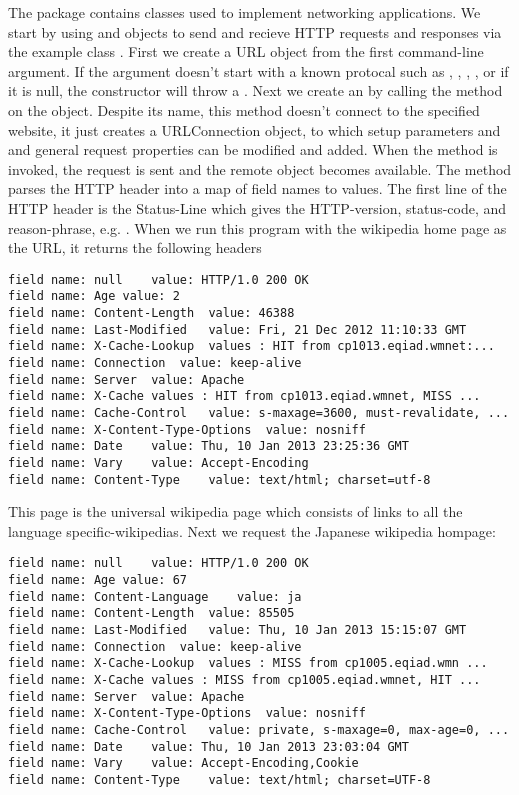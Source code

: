 The  package contains classes used to implement networking applications.
We start by using  and  objects
to send and recieve HTTP requests and responses via the example class .
%
%
%
First we create a URL object from the first command-line argument.
If the argument doesn't start with a known protocal such as
, , , , or if it is null,
the constructor will throw a .
Next we create an  by calling the 
method on the  object.
Despite its name, this method doesn't connect to the specified website, it just
creates a URLConnection object, to which setup parameters and and general 
request properties can be modified and added.
When the  method is invoked, the request is sent and the remote object
becomes available.  
%
%
The method  parses the HTTP header into a map of
field names to values.
The first line of the HTTP header is the Status-Line which gives the
HTTP-version, status-code, and  reason-phrase, e.g.
.
When we run this program with the wikipedia home page as the URL,
it returns the following headers
%
\begin{verbatim} 
field name: null	value: HTTP/1.0 200 OK 
field name: Age	value: 2
field name: Content-Length	value: 46388
field name: Last-Modified	value: Fri, 21 Dec 2012 11:10:33 GMT
field name: X-Cache-Lookup	values : HIT from cp1013.eqiad.wmnet:...
field name: Connection	value: keep-alive
field name: Server	value: Apache
field name: X-Cache	values : HIT from cp1013.eqiad.wmnet, MISS ...
field name: Cache-Control	value: s-maxage=3600, must-revalidate, ...
field name: X-Content-Type-Options	value: nosniff
field name: Date	value: Thu, 10 Jan 2013 23:25:36 GMT
field name: Vary	value: Accept-Encoding
field name: Content-Type	value: text/html; charset=utf-8
\end{verbatim}
%
This page is the universal wikipedia page which consists of links to all
the language specific-wikipedias.
Next we request the Japanese wikipedia hompage:
%
\begin{verbatim}
field name: null	value: HTTP/1.0 200 OK 
field name: Age	value: 67
field name: Content-Language	value: ja
field name: Content-Length	value: 85505
field name: Last-Modified	value: Thu, 10 Jan 2013 15:15:07 GMT
field name: Connection	value: keep-alive
field name: X-Cache-Lookup	values : MISS from cp1005.eqiad.wmn ...
field name: X-Cache	values : MISS from cp1005.eqiad.wmnet, HIT ...
field name: Server	value: Apache
field name: X-Content-Type-Options	value: nosniff
field name: Cache-Control	value: private, s-maxage=0, max-age=0, ...
field name: Date	value: Thu, 10 Jan 2013 23:03:04 GMT
field name: Vary	value: Accept-Encoding,Cookie
field name: Content-Type	value: text/html; charset=UTF-8
\end{verbatim}

